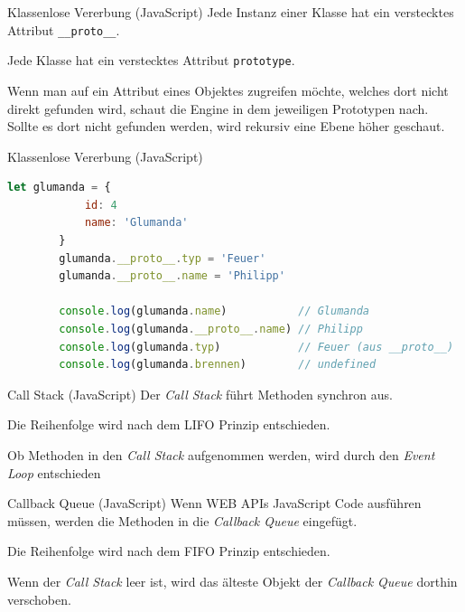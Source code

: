 \begin{bonus}{Klassenlose Vererbung (JavaScript)}
    Jede Instanz einer Klasse hat ein verstecktes Attribut \texttt{\_\_proto\_\_}.

    Jede Klasse hat ein verstecktes Attribut \texttt{prototype}.

    Wenn man auf ein Attribut eines Objektes zugreifen möchte, welches dort nicht direkt gefunden wird, schaut die Engine in dem jeweiligen Prototypen nach.
    Sollte es dort nicht gefunden werden, wird rekursiv eine Ebene höher geschaut.
\end{bonus}

\begin{example}{Klassenlose Vererbung (JavaScript)}
    \begin{lstlisting}[language=JavaScript]
        let glumanda = {
            id: 4
            name: 'Glumanda'
        }
        glumanda.__proto__.typ = 'Feuer'
        glumanda.__proto__.name = 'Philipp'

        console.log(glumanda.name)           // Glumanda
        console.log(glumanda.__proto__.name) // Philipp
        console.log(glumanda.typ)            // Feuer (aus __proto__)
        console.log(glumanda.brennen)        // undefined
    \end{lstlisting}
\end{example}

\begin{defi}{Call Stack (JavaScript)}
    Der \emph{Call Stack} führt Methoden synchron aus.

    Die Reihenfolge wird nach dem LIFO Prinzip entschieden.

    Ob Methoden in den \emph{Call Stack} aufgenommen werden, wird durch den \emph{Event Loop} entschieden
\end{defi}

\begin{defi}{Callback Queue (JavaScript)}
    Wenn WEB APIs JavaScript Code ausführen müssen, werden die Methoden in die \emph{Callback Queue} eingefügt.

    Die Reihenfolge wird nach dem FIFO Prinzip entschieden.

    Wenn der \emph{Call Stack} leer ist, wird das älteste Objekt der \emph{Callback Queue} dorthin verschoben.
\end{defi}

